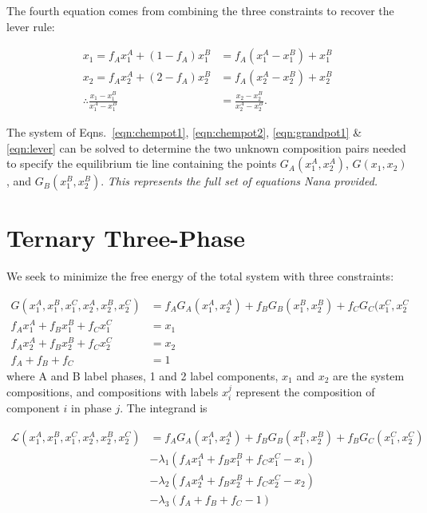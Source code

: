 \documentclass[10pt]{article}
\begin{document}
The fourth equation comes from combining the three constraints to recover the lever rule:

\begin{align}
  x_1 = f_A x_1^A + (1 - f_A) x_1^B &= f_A(x_1^A - x_1^B) + x_1^B\\
  x_2 = f_A x_2^A + (2 - f_A) x_2^B &= f_A(x_2^A - x_2^B) + x_2^B\\
  \label{eqn:lever}
  \therefore \frac{x_1 - x_1^B}{x_1^A - x_1^B} &= \frac{x_2 - x_2^B}{x_2^A - x_2^B}.
\end{align}

The system of Eqns.~\ref{eqn:chempot1}, \ref{eqn:chempot2}, \ref{eqn:grandpot1}
\& \ref{eqn:lever} can be solved to determine the two unknown composition pairs
needed to specify the equilibrium tie line containing the points
$G_A(x_1^A,x_2^A)$, $G(x_1,x_2)$, and $G_B(x_1^B,x_2^B)$. \emph{This represents
  the full set of equations Nana provided.}

\newpage
\section*{Ternary Three-Phase}

We seek to minimize the free energy of the total system with three constraints:

\begin{align}
  G(x_1^A, x_1^B, x_1^C, x_2^A, x_2^B, x_2^C) &= f_A G_A(x_1^A,x_2^A) + f_B G_B(x_1^B, x_2^B) + f_C G_C(x_1^C, x_2^C\\
  f_A x_1^A + f_B x_1^B + f_C x_1^C &= x_1\\
  f_A x_2^A + f_B x_2^B + f_C x_2^C &= x_2\\
  f_A + f_B + f_C &= 1
\end{align}
where A and B label phases, 1 and 2 label components, $x_1$ and $x_2$ are the system compositions,
and compositions with labels $x_i^j$ represent the composition of component $i$ in phase $j$.
The integrand is

\begin{align}
  \nonumber
  \mathcal{L}(x_1^A, x_1^B, x_1^C, x_2^A, x_2^B, x_2^C)
                         &= f_A G_A(x_1^A, x_2^A) + f_B G_B(x_1^B, x_2^B) + f_B G_C(x_1^C, x_2^C)\\
  \nonumber
                         &- \lambda_1(f_A x_1^A + f_B x_1^B + f_C x_1^C - x_1)\\
  \nonumber
                         &- \lambda_2(f_A x_2^A + f_B x_2^B + f_C x_2^C - x_2)\\
                         &- \lambda_3(f_A + f_B + f_C - 1)
\end{align}
\end{document}

